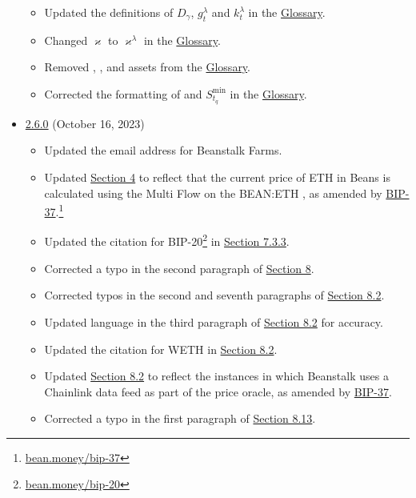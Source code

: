 \documentclass[class=article, crop=false]{standalone}
\begin{document}
\begin{itemize}[topsep=0pt, itemsep=3pt,leftmargin=16pt]
\begin{itemize}
        \item Updated the definitions of $D_{\gamma}$, $g_{t}^{\lambda}$ and $k_{t}^{\lambda}$ in the \hyperlink{subsection.14.11}{Glossary}.
        \item Changed $\varkappa$ to $\varkappa^{\lambda}$ in the \hyperlink{subsection.14.11}{Glossary}.
        \item Removed , ,  and  assets from the \hyperlink{subsection.14.11}{Glossary}. 
        \item Corrected the formatting of  and $S_{t_q}^{\text{min}}$ in the \hyperlink{subsection.14.11}{Glossary}.
    \end{itemize}
    \item \href{https://github.com/BeanstalkFarms/Beanstalk-Whitepaper/blob/master/version-history/beanstalk2_6_0.pdf}{2.6.0} (October 16, 2023)
    \begin{itemize}
        \item Updated the email address for Beanstalk Farms.
        \item Updated \hyperlink{section.4}{Section 4} to reflect that the current price of ETH in Beans is calculated using the Multi Flow  on the BEAN:ETH , as amended by \href{https://bean.money/bip-37}{BIP-37}.\footnote{\href{https://bean.money/bip-37}{bean.money/bip-37}}
        \item Updated the citation for BIP-20\footnote{\href{https://bean.money/bip-20}{bean.money/bip-20}} in \hyperlink{subsubsection.7.3.3.}{Section 7.3.3}.
        \item Corrected a typo in the second paragraph of \hyperlink{section.8}{Section 8}.
        \item Corrected typos in the second and seventh paragraphs of \hyperlink{subsection.8.2}{Section 8.2}.
        \item Updated language in the third paragraph of \hyperlink{subsection.8.2}{Section 8.2} for accuracy.
        \item Updated the citation for WETH in \hyperlink{subsection.8.2}{Section 8.2}.
        \item Updated \hyperlink{subsection.8.2}{Section 8.2} to reflect the instances in which Beanstalk uses a Chainlink data feed as part of the price oracle, as amended by \href{https://bean.money/bip-37}{BIP-37}.
        \item Corrected a typo in the first paragraph of \hyperlink{subsection.8.13}{Section 8.13}.

\end{itemize}
\end{itemize}
\end{document}
